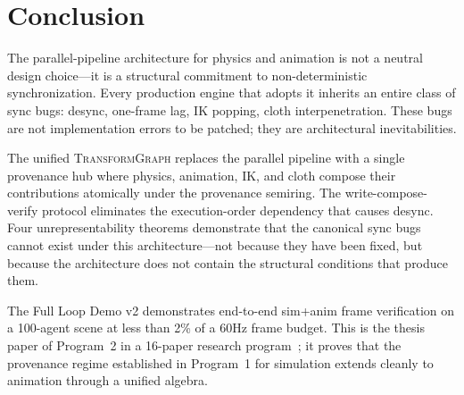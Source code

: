 \documentclass[sigconf,nonacm]{acmart}
\newcommand{\transformgraph}{\textsc{TransformGraph}}
\begin{document}
\section{Conclusion}
\label{sec:conclusion}

The parallel-pipeline architecture for physics and animation is
not a neutral design choice---it is a structural commitment to
non-deterministic synchronization. Every production engine that
adopts it inherits an entire class of sync bugs: desync,
one-frame lag, IK popping, cloth interpenetration. These bugs
are not implementation errors to be patched; they are
architectural inevitabilities.

The unified \transformgraph{} replaces the parallel pipeline
with a single provenance hub where physics, animation, IK, and
cloth compose their contributions atomically under the
provenance semiring. The write-compose-verify protocol
eliminates the execution-order dependency that causes desync.
Four unrepresentability theorems demonstrate that the canonical
sync bugs cannot exist under this architecture---not because
they have been fixed, but because the architecture does not
contain the structural conditions that produce them.

The Full Loop Demo v2 demonstrates end-to-end sim+anim frame
verification on a 100-agent scene at less than 2\% of a 60Hz
frame budget. This is the thesis paper of Program~2 in a
16-paper research program~\cite{capstone-uist2027}; it proves
that the provenance regime established in Program~1 for
simulation extends cleanly to animation through a unified
algebra.



\end{document}
